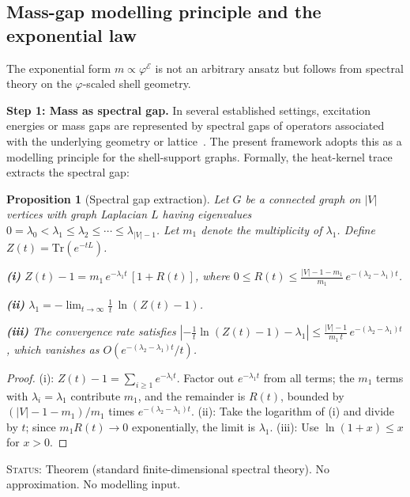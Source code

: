 \documentclass[12pt]{article}
\newtheorem{proposition}[theorem]{Proposition}
\newcommand{\phig}{\varphi}
\begin{document}
\subsection{Mass-gap modelling principle and the exponential law}\label{sec:masslaw}

The exponential form $m \propto \phig^{\mathcal{E}}$ is not an arbitrary ansatz but follows from spectral theory on the $\phig$-scaled shell geometry.

\textbf{Step 1: Mass as spectral gap.} In several established settings, excitation energies or mass gaps are represented by spectral gaps of operators associated with the underlying geometry or lattice~\citep{Wilson1974, JaffeWitten2000}. The present framework adopts this as a modelling principle for the shell-support graphs. Formally, the heat-kernel trace extracts the spectral gap:

\begin{proposition}[Spectral gap extraction]\label{prop:spectralgap}
Let $G$ be a connected graph on $|V|$ vertices with graph Laplacian $L$ having eigenvalues $0 = \lambda_0 < \lambda_1 \leq \lambda_2 \leq \cdots \leq \lambda_{|V|-1}$. Let $m_1$ denote the multiplicity of $\lambda_1$. Define $Z(t) = \mathrm{Tr}(e^{-tL})$.

\textbf{(i)} $Z(t) - 1 = m_1\, e^{-\lambda_1 t}\,[1 + R(t)]$, where $0 \leq R(t) \leq \frac{|V| - 1 - m_1}{m_1}\, e^{-(\lambda_2 - \lambda_1)t}$.

\textbf{(ii)} $\lambda_1 = -\lim_{t \to \infty} \frac{1}{t}\, \ln(Z(t) - 1)$.

\textbf{(iii)} The convergence rate satisfies $\left|-\frac{1}{t}\ln(Z(t)-1) - \lambda_1\right| \leq \frac{|V|-1}{m_1\, t}\, e^{-(\lambda_2 - \lambda_1)t}$, which vanishes as $O(e^{-(\lambda_2 - \lambda_1)t}/t)$.
\end{proposition}

\begin{proof}
(i): $Z(t) - 1 = \sum_{i \geq 1} e^{-\lambda_i t}$. Factor out $e^{-\lambda_1 t}$ from all terms; the $m_1$ terms with $\lambda_i = \lambda_1$ contribute $m_1$, and the remainder is $R(t)$, bounded by $(|V|-1-m_1)/m_1$ times $e^{-(\lambda_2 - \lambda_1)t}$. (ii): Take the logarithm of (i) and divide by $t$; since $m_1 R(t) \to 0$ exponentially, the limit is $\lambda_1$. (iii): Use $\ln(1+x) \leq x$ for $x > 0$.
\end{proof}

\textsc{Status:} Theorem (standard finite-dimensional spectral theory). No approximation. No modelling input.
\end{document}
